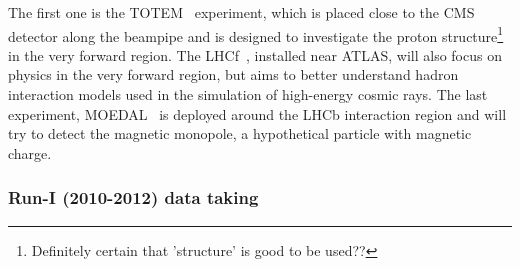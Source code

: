The first one is the TOTEM~\cite{TotemDetectorPaper} experiment, which is placed close to the CMS detector along the beampipe and is designed to investigate the proton structure\footnote{Definitely certain that 'structure' is good to be used??} in the very forward region. The LHCf~\cite{LHCfDetectorPaper}, installed near ATLAS, will also focus on physics in the very forward region, but aims to better understand hadron interaction models used in the simulation of high-energy cosmic rays.
The last experiment, MOEDAL~\cite{MoedalDetectorPaper} is deployed around the LHCb interaction region and will try to detect the magnetic monopole, a hypothetical particle with magnetic charge.

\subsubsection{Run-I (2010-2012) data taking}


